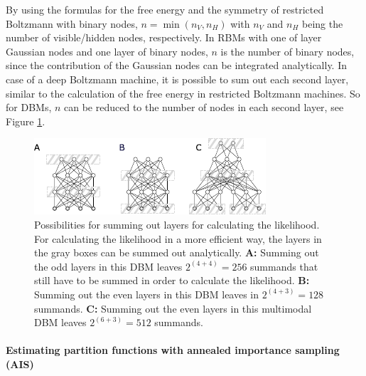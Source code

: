 \documentclass[12pt]{article}
\begin{document}
By using the formulas for the free energy and the symmetry of restricted Boltzmann with binary nodes, $n = \min(n_V, n_H)$ with $n_V$ and $n_H$ being the number of visible/hidden nodes, respectively.
In RBMs with one of layer Gaussian nodes and one layer of binary nodes, $n$ is the number of binary nodes, since the contribution of the Gaussian nodes can be integrated analytically.
In case of a deep Boltzmann machine, it is possible to sum out each second layer, similar to the calculation of the free energy in restricted Boltzmann machines. So for DBMs, $n$ can be reduced to the number of nodes in each second layer, see Figure \ref{aissummingout}.

\begin{figure}[h!]
\centering
\includegraphics[scale=2.5]{images/AISsummingout.pdf}
\caption{Possibilities for summing out layers for calculating the likelihood. For calculating the likelihood in a more efficient way, the layers in the gray boxes can be summed out analytically. {\bf A:} Summing out the odd layers in this DBM leaves $2^{(4 + 4)} = 256$ summands that still have to be summed in order to calculate the likelihood. {\bf B:} Summing out the even layers in this DBM leaves in $2^{(4 + 3)} = 128$ summands. {\bf C:} Summing out the even layers in  this multimodal DBM leaves $2^{(6 + 3)} = 512$ summands.}
\label{aissummingout}
\end{figure}

\paragraph{Estimating partition functions with annealed importance sampling (AIS)}\label{methodAIS}
\end{document}
